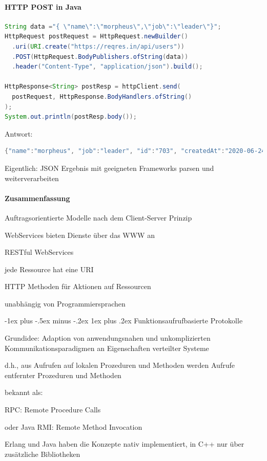 \documentclass[10pt]{article}
\makeatletter
\renewcommand{\subsubsection}{\@startsection{subsubsection}{3}{0mm}%
                                {-1ex plus -.5ex minus -.2ex}%
                                {1ex plus .2ex}%
                                {\normalfont\small\bfseries}}
\makeatother
\begin{document}
\paragraph{HTTP POST in Java}
\begin{lstlisting}[language=java]
String data ="{ \"name\":\"morpheus\",\"job\":\"leader\"}";
HttpRequest postRequest = HttpRequest.newBuilder()
  .uri(URI.create("https://reqres.in/api/users"))
  .POST(HttpRequest.BodyPublishers.ofString(data))
  .header("Content-Type", "application/json").build();

HttpResponse<String> postResp = httpClient.send(
  postRequest, HttpResponse.BodyHandlers.ofString()
);
System.out.println(postResp.body());
\end{lstlisting}
Antwort:
\begin{lstlisting}[language=java]
{"name":"morpheus", "job":"leader", "id":"703", "createdAt":"2020-06-24T12:09:22.148Z"}
\end{lstlisting}
Eigentlich: JSON Ergebnis mit geeigneten Frameworks parsen und weiterverarbeiten

\paragraph{Zusammenfassung}

\begin{itemize*}
  \item Auftragsorientierte Modelle nach dem Client-Server Prinzip
  \item WebServices bieten Dienste über das WWW an
  \item RESTful WebServices
  \begin{itemize*}
    \item jede Ressource hat eine URI
    \item HTTP Methoden für Aktionen auf Ressourcen
    \item unabhängig von Programmiersprachen
  \end{itemize*}
\end{itemize*}

\subsubsection{Funktionsaufrufbasierte Protokolle}
\begin{itemize*}
  \item Grundidee: Adaption von anwendungsnahen und unkomplizierten Kommunikationsparadigmen an Eigenschaften verteilter Systeme
  \item d.h., aus Aufrufen auf lokalen Prozeduren und Methoden werden Aufrufe entfernter Prozeduren und Methoden
  \item bekannt als:
  \begin{itemize*}
    \item RPC: Remote Procedure Calls
    \item oder Java RMI: Remote Method Invocation
  \end{itemize*}
  \item Erlang und Java haben die Konzepte nativ implementiert, in C++ nur über zusätzliche Bibliotheken
\end{itemize*}
\end{document}
